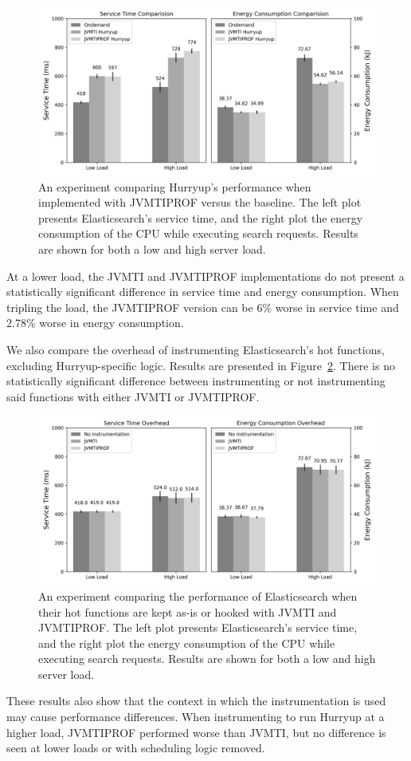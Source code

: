 \begin{figure}[ht]
\centering
\includegraphics[width=1.0\textwidth]{src/figure/ondem_vs_hup_vs_newhup.mono.png}
\caption{An experiment comparing Hurryup's performance when implemented with JVMTIPROF versus the baseline. The left plot presents Elasticsearch's service time, and the right plot the energy consumption of the CPU while executing search requests. Results are shown for both a low and high server load.}
\label{fig:ondem_vs_hup_vs_newhup}
\end{figure}

At a lower load, the JVMTI and JVMTIPROF implementations do not present a statistically significant difference in service time and energy consumption. When tripling the load, the JVMTIPROF version can be 6\% worse in service time and 2.78\% worse in energy consumption.

We also compare the overhead of instrumenting Elasticsearch's hot functions, excluding Hurryup-specific logic. Results are presented in Figure~\ref{fig:overhead}. There is no statistically significant difference between instrumenting or not instrumenting said functions with either JVMTI or JVMTIPROF.

\begin{figure}[ht]
\centering
\includegraphics[width=1.0\textwidth]{src/figure/overhead.mono.png}
\caption{An experiment comparing the performance of Elasticsearch when their hot functions are kept as-is or hooked with JVMTI and JVMTIPROF. The left plot presents Elasticsearch's service time, and the right plot the energy consumption of the CPU while executing search requests. Results are shown for both a low and high server load.}
\label{fig:overhead}
\end{figure}

These results also show that the context in which the instrumentation is used may cause performance differences. When instrumenting to run Hurryup at a higher load, JVMTIPROF performed worse than JVMTI, but no difference is seen at lower loads or with scheduling logic removed.
